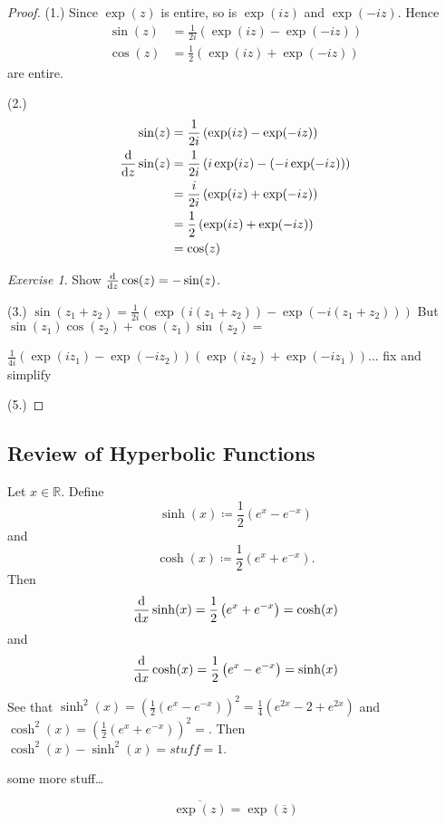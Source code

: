 \documentclass[11pt]{article}
\newcommand{\br}[1]{\left(#1\right)}
\theoremstyle{remark}
\theoremstyle{definition}
\theoremstyle{remark}
\theoremstyle{definition}
\theoremstyle{remark}
\newtheorem*{exercise}{Exercise}
\begin{document}
\begin{proof}
  (1.) Since $\exp(z)$ is entire, so is $\exp(iz)$ and $\exp(-iz)$. Hence \begin{align*}
    \sin(z) &= \frac{1}{2i}\br{\exp(iz)-\exp(-iz)} \\
    \cos(z) &= \frac{1}{2}\br{\exp(iz)+\exp(-iz)}
  \end{align*} are entire. 

  (2.) \begin{align*}
    \sin(z) &= \frac{1}{2i}\br{\exp(iz) - \exp(-iz)} \\
    \dv{z}\sin(z) &= \frac{1}{2i}\br{i\exp(iz)-\br{-i\exp(-iz)}} \\
    &= \frac{i}{2i}\br{\exp(iz)+\exp(-iz)} \\
    &= \frac{1}{2}\br{\exp(iz)+\exp(-iz)} \\
    &= \cos(z)
  \end{align*}

  \begin{exercise}
    Show $\dv{z}\cos(z) = -\sin(z)$.
  \end{exercise}
  
  (3.) $\sin(z_1+z_2) = \frac{1}{2i}\br{\exp(i(z_1+z_2)) - \exp(-i(z_1+z_2))}$ But $\sin(z_1)\cos(z_2) + \cos(z_1)\sin(z_2) =$ 
  
  $\frac{1}{4i}\br{\exp(iz_1)-\exp(-iz_2)}\br{\exp(iz_2)+\exp(-iz_1)}$... fix and simplify

  (5.) 
\end{proof}

\subsection{Review of Hyperbolic Functions} Let $x\in\mathbb{R}$. Define $$\sinh(x) \coloneqq \frac{1}{2}\br{e^x-e^{-x}}$$ and $$\cosh(x) \coloneqq \frac{1}{2}\br{e^{x}+e^{-x}}.$$ Then $$\dv{x}\sinh(x) = \frac{1}{2}\br{e^{x}+e^{-x}} = \cosh(x)$$ and $$\dv{x}\cosh(x) = \frac{1}{2}\br{e^x-e^{-x}} = \sinh(x)$$


See that $\sinh^2(x) = \br{\frac{1}{2}\br{e^x-e^{-x}}}^2 = \frac{1}{4}\br{e^{2x}-2+e^{2x}}$ and $\cosh^2(x) = \br{\frac{1}{2}\br{e^{x}+e^{-x}}}^2 = $. Then $\cosh^2(x)-\sinh^2(x) = stuff = 1$.


some more stuff\dots

$$\overline{\exp(z)} = \exp(\overline{z})$$
\end{document}
